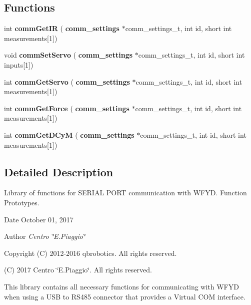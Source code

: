 \subsection*{Functions}
\begin{DoxyCompactItemize}
\item 
\mbox{\label{w__fyd__communications_8h_a9e9e8a0bb8644a0de99085f33faa1ac9}} 
int {\bfseries comm\+Get\+IR} (\textbf{ comm\+\_\+settings} $\ast$comm\+\_\+settings\+\_\+t, int id, short int measurements[1])
\item 
\mbox{\label{w__fyd__communications_8h_a10d1a5e2641255a2bcf56d5fb60bdfda}} 
void {\bfseries comm\+Set\+Servo} (\textbf{ comm\+\_\+settings} $\ast$comm\+\_\+settings\+\_\+t, int id, short int inputs[1])
\item 
\mbox{\label{w__fyd__communications_8h_ac07d3498ca20b672831a597a0ac63369}} 
int {\bfseries comm\+Get\+Servo} (\textbf{ comm\+\_\+settings} $\ast$comm\+\_\+settings\+\_\+t, int id, short int measurements[1])
\item 
\mbox{\label{w__fyd__communications_8h_a02a9df4bac7885c5f10c70617df705a8}} 
int {\bfseries comm\+Get\+Force} (\textbf{ comm\+\_\+settings} $\ast$comm\+\_\+settings\+\_\+t, int id, short int measurements[1])
\item 
\mbox{\label{w__fyd__communications_8h_a3fc8bc2506b1e918938d08c3539813d1}} 
int {\bfseries comm\+Get\+D\+CyM} (\textbf{ comm\+\_\+settings} $\ast$comm\+\_\+settings\+\_\+t, int id, short int measurements[1])
\end{DoxyCompactItemize}


\subsection{Detailed Description}
Library of functions for S\+E\+R\+I\+AL P\+O\+RT communication with W\+F\+YD. Function Prototypes. 

\begin{DoxyDate}{Date}
October 01, 2017 
\end{DoxyDate}
\begin{DoxyAuthor}{Author}
{\itshape Centro \char`\"{}\+E.\+Piaggio\char`\"{}} 
\end{DoxyAuthor}
\begin{DoxyCopyright}{Copyright}
(C) 2012-\/2016 qbrobotics. All rights reserved. 

(C) 2017 Centro \char`\"{}\+E.\+Piaggio\char`\"{}. All rights reserved.
\end{DoxyCopyright}
This library contains all necessary functions for communicating with W\+F\+YD when using a U\+SB to R\+S485 connector that provides a Virtual C\+OM interface. 